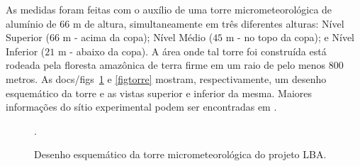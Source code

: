 As medidas foram feitas com o auxílio de uma torre micrometeorológica de alumínio de $66$ m de altura, simultaneamente em três diferentes alturas: Nível Superior ($66$ m - acima da copa); Nível Médio ($45$ m - no topo da copa); e Nível Inferior ($21$ m - abaixo da copa). 
A área onde tal torre foi construída está rodeada pela floresta amazônica de terra firme em um raio de pelo menos $800$ metros. As docs/figs~\ref{torre} e \ref{figtorre} mostram, respectivamente, um desenho esquemático da torre e as vistas superior e inferior da mesma. Maiores informações do sítio experimental podem ser encontradas em .

\begin{figure}[ht]
	\caption{Desenho esquemático da torre micrometeorológica do projeto LBA.}
	\vspace{6mm}	%
	\begin{center}
	\end{center}
	\vspace{2mm}	%
	\legenda{}	%
	\label{torre}
	.
\end{figure}

